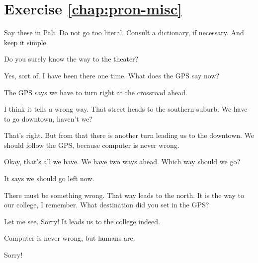 \section*{Exercise \ref{chap:pron-misc}}
Say these in P\=ali. Do not go too literal. Consult a dictionary, if necessary. And keep it simple.
\begin{compactenum}
\item Do you surely know the way to the theater?
\item Yes, sort of. I have been there one time. What does the GPS say now?
\item The GPS says we have to turn right at the crossroad ahead.
\item I think it tells a wrong way. That street heads to the southern suburb. We have to go downtown, haven't we?
\item That's right. But from that there is another turn leading us to the downtown. We should follow the GPS, because computer is never wrong.
\item Okay, that's all we have. We have two ways ahead. Which way should we go?
\item It says we should go left now.
\item There must be something wrong. That way leads to the north. It is the way to our college, I remember. What destination did you set in the GPS?
\item Let me see. Sorry! It leads us to the college indeed.
\item Computer is never wrong, but humans are.
\item Sorry!
\end{compactenum}
